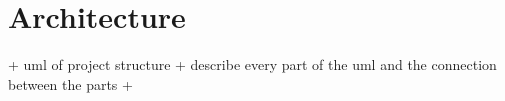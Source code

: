\section{Architecture}
\label{sec:architecture}

+ uml of project structure
+ describe every part of the uml and the connection between the parts
+ 